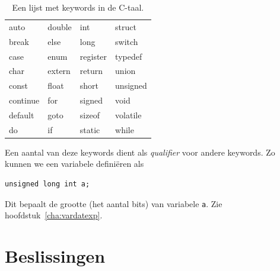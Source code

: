 \begin{table}[!ht]
\caption{Een lijst met keywords in de C-taal.}
\label{tab:unkeywords}
\centering\ttfamily
\begin{tabular}{p{2.5cm}p{2.5cm}p{2.5cm}p{2.5cm}}
\toprule
auto &  double &  int & struct \\
break & else  & long  &  switch \\
case & enum & register & typedef \\
char & extern & return & union \\
const & float & short &  unsigned \\
continue & for & signed & void \\
default & goto & sizeof & volatile \\
do & if & static & while \\
\bottomrule
\end{tabular}
\end{table}

Een aantal van deze keywords dient als \textsl{qualifier} voor andere keywords. Zo kunnen we een variabele definiëren als

\begin{lstlisting}[style=lstoneline]
unsigned long int a;
\end{lstlisting}

Dit bepaalt de grootte (het aantal bits) van variabele \texttt{a}. Zie hoofdstuk~\ref{cha:vardatexp}.


\section{Beslissingen}

